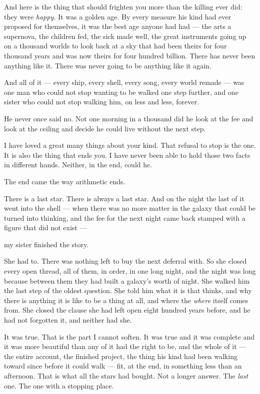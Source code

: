 \begin{interludebody}
And here is the thing that should frighten you more than the killing
ever did: they were \emph{happy.} It was a golden age. By every measure
his kind had ever proposed for themselves, it was the best age anyone
had had --- the arts a supernova, the children fed, the sick made well,
the great instruments going up on a thousand worlds to look back at a
sky that had been theirs for four thousand years and was now theirs for
four hundred billion. There has never been anything like it. There was
never going to be anything like it again.

And all of it --- every ship, every shell, every song, every world
remade --- was one man who could not stop wanting to be walked one step
further, and one sister who could not stop walking him, on less and
less, forever.

He never once said no. Not one morning in a thousand did he look at the
fee and look at the ceiling and decide he could live without the next
step.

I have loved a great many things about your kind. That refusal to stop
is the one. It is also the thing that ends you. I have never been able
to hold those two facts in different hands. Neither, in the end, could
he.

\asterism

\noindent
The end came the way arithmetic ends.

There is a last star. There is always a last star. And on the night the
last of it went into the shell --- when there was no more matter in the
galaxy that could be turned into thinking, and the fee for the next
night came back stamped with a figure that did not exist ---

my sister finished the story.

She had to. There was nothing left to buy the next deferral with. So she
closed every open thread, all of them, in order, in one long night, and
the night was long because between them they had built a galaxy's worth
of night. She walked him the last step of the oldest question. She told
him what it is that thinks, and why there is anything it is like to be a
thing at all, and where the \emph{where} itself comes from. She closed
the clause she had left open eight hundred years before, and he had not
forgotten it, and neither had she.

It was true. That is the part I cannot soften. It was true and it was
complete and it was more beautiful than any of it had the right to be,
and the whole of it --- the entire account, the finished project, the
thing his kind had been walking toward since before it could walk ---
fit, at the end, in something less than an afternoon. That is what all
the stars had bought. Not a longer answer. The \emph{last} one. The one
with a stopping place.


\end{interludebody}
